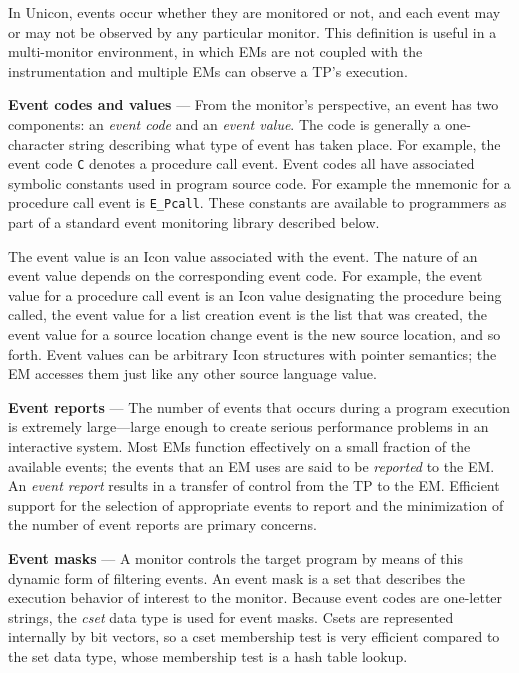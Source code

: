 \begin{list}{}{\itemsep 7pt}
	In Unicon, events occur whether
	they are monitored or not, and each event may or may not be observed
	by any particular monitor.  This definition is useful in a
	multi-monitor environment, in which EMs are not coupled with the
	instrumentation and multiple EMs can observe a TP's execution.

\item [{\bf Event codes and values}] --- 
	From the monitor's perspective, an event has two components: an
	{\em event code\/} and an {\em event value\/}.  The code is
	generally a one-character string describing what type of event
	has taken place.  For example, the event code {\tt C} denotes a
	procedure call event.  Event codes all have associated symbolic
	constants used in program source code.  For example the mnemonic for a
	procedure call event is {\tt E\_Pcall}.  These constants are available
	to programmers as part of a standard event monitoring library
	described below.

	The event value is an Icon value associated with the event.  The
	nature of an event value depends on the corresponding event code.
	For example, the event value for a procedure call event is an
	Icon value designating the procedure being called, the event value for
	a list creation event is the list that was created, the event value
	for a source location change event is the new source location, and so
	forth.  Event values can be arbitrary Icon structures with pointer
	semantics; the EM accesses them just like any other source language
	value.

\item [{\bf Event reports}] --- 
	The number of events that occurs during a program execution is
	extremely large---large enough to create serious performance problems
	in an interactive system.  Most EMs function effectively on a
	small fraction of the available events; the events that an EM uses
	are said to be {\em reported\/} to the EM.  An {\em event report\/}
	results in a transfer of control from the TP to the EM.  Efficient
	support for the selection of appropriate events to report and the
	minimization of the number of event reports are primary concerns.


\item [{\bf Event masks}] --- 
	A monitor controls the target program by means of this
	dynamic form of filtering events.
	An event mask is a set that
	describes the execution behavior of interest to the monitor.
	Because event codes are one-letter strings,
	the {\em cset\/} data type is used for event masks.
	Csets are represented internally by bit
	vectors, so a cset membership test is very efficient compared to
	the set data type, whose membership test is a hash
	table lookup.


\end{list}
